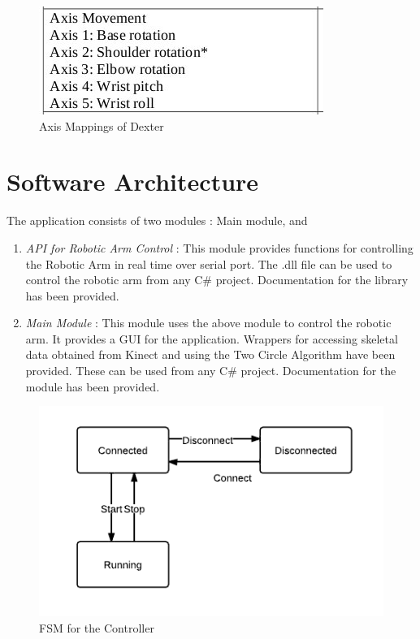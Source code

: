 \documentclass[a4paper,11pt]{article}
\begin{document}
\begin{itemize}
\begin{figure}[htp]
\centering
\includegraphics[scale=0.6]{images/arm-axes-table.jpg}
\caption{Axis Mappings of Dexter}
\end{figure}
\newpage
\end{itemize}

\section{Software Architecture}
The application consists of two modules : Main module, and 
\begin{enumerate}
\item \emph{API for Robotic Arm Control} : This module provides functions for controlling the Robotic Arm in real time over serial port. The .dll file can be used to control the robotic arm from any C\# project. Documentation for the library has been provided.
\item \emph{Main Module} : This module uses the above module to control the robotic arm. It provides a GUI for the application. Wrappers for accessing skeletal data obtained from Kinect and using the Two Circle Algorithm have been provided. These can be used from any C\# project. Documentation for the module has been provided.
\end{enumerate}

\begin{figure}[htp]
\centerline{\includegraphics[scale=0.7]{images/guifsm.png}}
\caption{FSM for the Controller}\label{fig:exp}
\end{figure}
\end{document}
